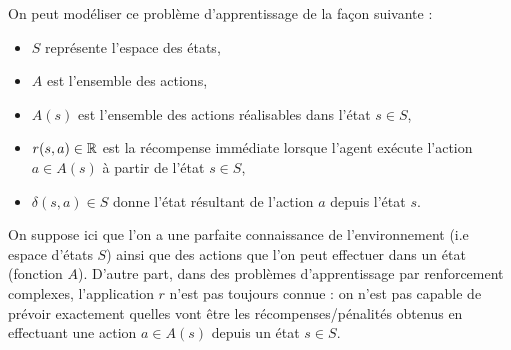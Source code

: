 \begin{definition}
    On peut modéliser ce problème d'apprentissage de la façon suivante : 
    \begin{itemize}
        \item $S$ représente l'espace des états, 
        \item $A$ est l'ensemble des actions, 
        \item $A(s)$ est l'ensemble des actions réalisables dans l'état $s \in S$, 
        \item $r(s,a) \in \mathbb{R}$ est la récompense immédiate lorsque l'agent exécute l'action $a \in A(s)$ à partir de l'état $s \in S$, 
        \item $ \delta(s, a) \in S$ donne l'état résultant de l'action $a$ depuis l'état $s$. 
    \end{itemize}
\end{definition}

\begin{remark}
    On suppose ici que l'on a une parfaite connaissance de l'environnement (i.e espace d'états $S$) ainsi que des actions que l'on peut effectuer dans un état (fonction $A$). 
    D'autre part, dans des problèmes d'apprentissage par renforcement complexes, l'application $r$ n'est pas toujours connue : on n'est pas capable de prévoir exactement quelles vont être les récompenses/pénalités obtenus en effectuant une action $a \in A(s)$ depuis un état $s \in S$. 
\end{remark}

